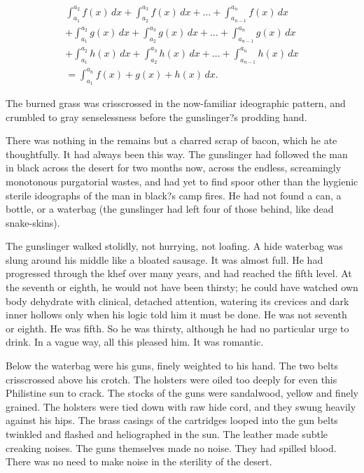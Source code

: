 \documentclass[
11pt,%
tightenlines,%
twoside,%
onecolumn,%
nofloats,%
nobibnotes,%
nofootinbib,%
superscriptaddress,%
noshowpacs,%
centertags]%
{revtex4}
\begin{document}
\begin{multline}
\int_{a_1}^{a_2} f(x)\,dx+\int_{a_2}^{a_3} f(x)\,dx
+\dots+\int_{a_{n-1}}^{a_n} f(x)\,dx\\
+\int_{a_1}^{a_2} g(x)\,dx+\int_{a_2}^{a_3} g(x)\,dx
+\dots+\int_{a_{n-1}}^{a_n} g(x)\,dx\\
+\int_{a_1}^{a_2} h(x)\,dx+\int_{a_2}^{a_3} h(x)\,dx
+\dots+\int_{a_{n-1}}^{a_n} h(x)\,dx\\
=\int_{a_1}^{a_n} f(x)+g(x)+h(x)\,dx.
\end{multline}

The burned grass was crisscrossed in the now-familiar ideographic pattern, and crumbled to gray senselessness before the gunslinger?s prodding hand. 

There was nothing in the remains but a charred scrap of bacon, which he ate thoughtfully. It had always been this way. The gunslinger had followed the man in black across the desert for two months now, across the endless, screamingly monotonous purgatorial wastes, and had yet to find spoor other than the hygienic sterile ideographs of the man in black?s camp fires. He had not found a can, a bottle, or a waterbag (the gunslinger had left four of those behind, like dead snake-skins).

The gunslinger walked stolidly, not hurrying, not loafing. A hide waterbag was slung around his middle like a bloated sausage. It was almost full. He had progressed through the khef over many years, and had reached the fifth level. At the seventh or eighth, he would not have been thirsty; he could have watched own body dehydrate with clinical, detached attention, watering its crevices and dark inner hollows only when his logic told him it must be done. He was not seventh or eighth. He was fifth. So he was thirsty, although he had no particular urge to drink. In a vague way, all this pleased him. It was romantic.

Below the waterbag were his guns, finely weighted to his hand. The two belts crisscrossed above his crotch. The holsters were oiled too deeply for even this Philistine sun to crack. The stocks of the guns were sandalwood, yellow and finely grained. The holsters were tied down with raw hide cord, and they swung heavily against his hips. The brass casings of the cartridges looped into the gun belts twinkled and flashed and heliographed in the sun. The leather made subtle creaking noises. The guns themselves made no noise. They had spilled blood. There was no need to make noise in the sterility of the desert.
\end{document}
